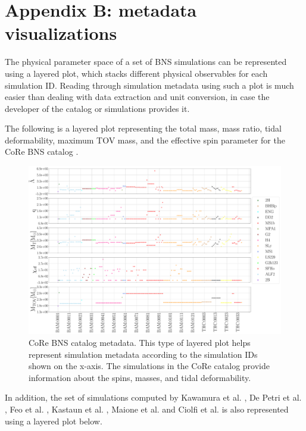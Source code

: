 \chapter*{Appendix B: metadata visualizations}\label{layer}

The physical parameter space of a set of BNS simulations can be represented using a layered plot, which stacks different physical observables for each simulation ID. Reading through simulation metadata using such a plot is much easier than dealing with data extraction and unit conversion, in case the developer of the catalog or simulations provides it. 

The following is a layered plot representing the total mass, mass ratio, tidal deformability, maximum TOV mass, and the effective spin parameter for the CoRe BNS catalog \cite{Dietrich:2018phi}.



\begin{figure}[hbt!]
\begin{center}
\includegraphics[width=\textwidth]{images/Data_analysis/results/CORE_cat.pdf} 
\captionsetup{width=0.8\textwidth}
\caption[CoRe BNS catalog metadata]{CoRe BNS catalog metadata. This type of layered plot helps represent simulation metadata according to the simulation IDs shown on the x-axis. The simulations in the CoRe catalog\cite{Dietrich:2018phi} provide information about the spins, masses, and tidal deformability.}
\end{center}
\label{corecat}
\end{figure}
\FloatBarrier

\newpage

In addition, the set of simulations computed by Kawamura et al. \cite{Kawamura:2016nmk}, De Petri et al. \cite{DePietri:2018tpx,DePietri:2015lya}, Feo et al. \cite{Feo:2016cbs}, Kastaun et al. \cite{Kastaun:2016elu}, Maione et al. \cite{Maione:2016zqz,Maione:2017aux} and Ciolfi et al. \cite{Ciolfi:2017uak} is also represented using a layered plot below.

